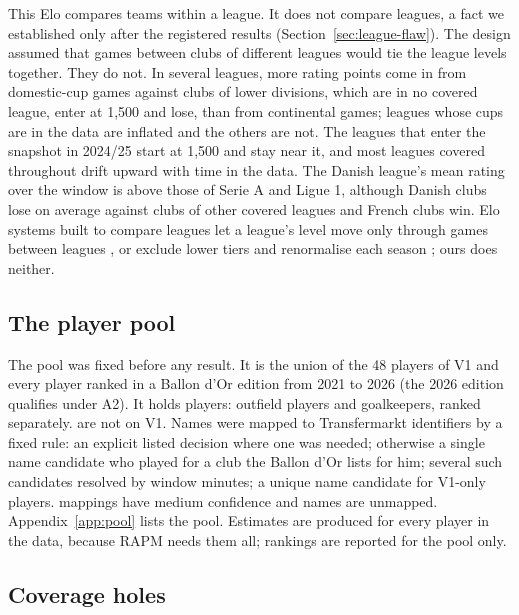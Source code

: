 \documentclass[11pt,a4paper]{article}
\begin{document}
This Elo compares teams within a league. It does not compare leagues, a fact
we established only after the registered results
(Section~\ref{sec:league-flaw}). The design assumed that games between clubs of
different leagues would tie the league levels together. They do not. In
several leagues, more rating points come in from domestic-cup games against
clubs of lower divisions, which are in no covered league, enter at 1,500 and
lose, than from continental games; leagues whose cups are in the data are
inflated and the others are not. The leagues that enter the snapshot in
2024/25 start at 1,500 and stay near it, and most leagues covered throughout
drift upward with time in the data. The Danish league's mean rating over the
window is above those of Serie A and Ligue 1,
although Danish clubs lose on average against clubs of other covered leagues
and French clubs win. Elo systems built to compare leagues let a league's
level move only through games between leagues \citep{csato2024elo}, or
exclude lower tiers and renormalise each season
\citep{shelopugin2023leagues}; ours does neither.

\subsection{The player pool}

The pool was fixed before any result. It is the union of the 48 players of V1
and every player ranked in a Ballon d'Or edition from 2021 to 2026 (the 2026
edition qualifies under A2). It holds \NPool{} players: \NPoolOutfield{}
outfield players and \NPoolGoalkeepers{} goalkeepers, ranked separately.
\NPoolBdoOnly{} are not on V1. Names were mapped to Transfermarkt identifiers
by a fixed rule: an explicit listed decision where one was needed; otherwise a
single name candidate who played for a club the Ballon d'Or lists for him;
several such candidates resolved by window minutes; a unique name candidate
for V1-only players. \NPoolMediumConfidence{} mappings have medium confidence
and \NPoolUnmapped{} names are unmapped. Appendix~\ref{app:pool} lists the
pool. Estimates are produced for every player in the data, because RAPM needs
them all; rankings are reported for the pool only.

\subsection{Coverage holes}
\end{document}
